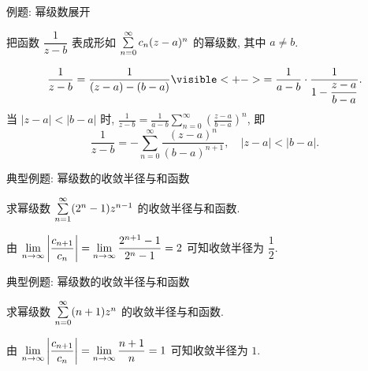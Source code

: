 \begin{frame}{例题: 幂级数展开}
\onslide<+->
\begin{example}
把函数 $\dfrac1{z-b}$ 表成形如 $\sum\limits_{n=0}^\infty c_n(z-a)^n$ 的幂级数, 其中 $a\neq b$.
\end{example}
\onslide<+->
\begin{solution}
\[\frac1{z-b}=\frac1{(z-a)-(b-a)}
\visible<+->{=\frac1{a-b}\cdot\frac1{1-\dfrac{z-a}{b-a}}.}\]
\onslide<+->
当 $|z-a|<|b-a|$ 时,
\onslide<+->
$\displaystyle\frac1{z-b}=\frac1{a-b}\sum_{n=0}^\infty\left(\frac{z-a}{b-a}\right)^n$,
\onslide<+->
即
\[\frac1{z-b}=-\sum_{n=0}^\infty\frac{(z-a)^n}{(b-a)^{n+1}},\quad|z-a|<|b-a|.\]
\vspace{-3pt}
\end{solution}
\end{frame}


\begin{frame}{典型例题: 幂级数的收敛半径与和函数}
\onslide<+->
\begin{example}
求幂级数 $\sum\limits_{n=1}^\infty(2^n-1)z^{n-1}$ 的收敛半径与和函数.
\end{example}
\onslide<+->
\begin{solution}
由 $\displaystyle\lim_{n\to\infty}\left|\frac{c_{n+1}}{c_n}\right|=\lim_{n\to\infty}\frac{2^{n+1}-1}{2^n-1}=2$ 可知收敛半径为 $\dfrac12$.
\vspace{-\baselineskip}
\end{solution}
\end{frame}


\begin{frame}{典型例题: 幂级数的收敛半径与和函数}
\onslide<+->
\begin{example}
求幂级数 $\sum\limits_{n=0}^\infty(n+1)z^n$ 的收敛半径与和函数.
\end{example}
\onslide<+->
\begin{solution}
由 $\displaystyle\lim_{n\to\infty}\left|\frac{c_{n+1}}{c_n}\right|=\lim_{n\to\infty}\frac{n+1}n=1$ 可知收敛半径为 $1$.
\vspace{-\baselineskip}
\end{solution}
\end{frame}


